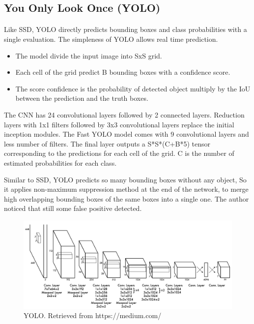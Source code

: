 \documentclass[12pt]{report}
\begin{document}
                \subsection{You Only Look Once (YOLO)}
                \paragraph{}
                    Like SSD, YOLO directly predicts bounding boxes and class probabilities
                    with a single evaluation. The simpleness of YOLO allows real time prediction.
                    \begin{itemize}
                        \item The model divide the input image into SxS grid.
                        \item Each cell of the grid predict B bounding boxes with a confidence score.
                        \item The score confidence is the probability of detected object multiply by the IoU between the prediction and the truth boxes.
                    \end{itemize}
                    The CNN has 24 convolutional layers followed by 2 connected layers.
                    Reduction layers with 1x1 filters followed by 3x3 convolutional layers 
                    replace the initial inception modules.
                    \bigbreak
                    The Fast YOLO model comes with 9  convolutional layers and less number of filters.
                    The final layer outputs a S*S*(C+B*5) tensor corresponding to the predictions for each cell of the grid.
                    C is the number of estimated probabilities for each class.

                    Similar to SSD, YOLO predicts so many bounding boxes without any object,
                    So it applies non-maximum suppression method at the end of the network,
                    to merge high overlapping bounding boxes of the same boxes into a single one.
                    The author noticed that still some false positive detected.\cite{Redmon2016}

                    
                    \bigbreak
                    \bigbreak
                    \bigbreak


                    \begin{figure}[h]
                    \centering
                    \includegraphics[width=1\textwidth]{./images/yolo.png}
                    \caption{YOLO. Retrieved from https://medium.com/}
                    \label{fig:frcnn}
                    \end{figure} 
\end{document}
